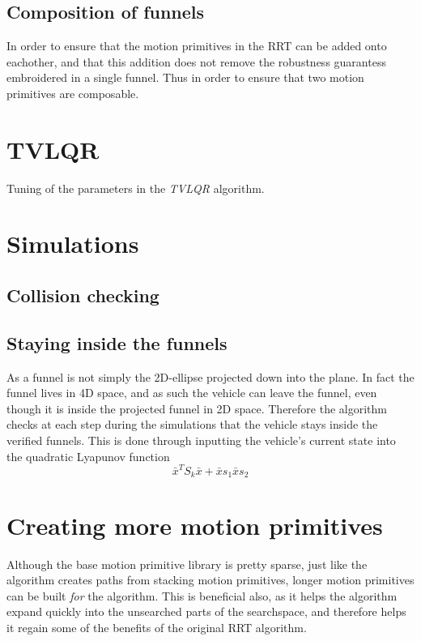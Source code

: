 \subsection{Composition of funnels}

In order to ensure that the motion primitives in the \ac{RRT} can be added onto
eachother, and that this addition does not remove the robustness guarantess
embroidered in a single funnel. Thus in order to ensure that two motion
primitives are composable.

\section{TVLQR}

Tuning of the parameters in the \textit{TVLQR} algorithm.

\section{Simulations}

\subsection{Collision checking}

\subsection{Staying inside the funnels}

As a funnel is not simply the 2D-ellipse projected down into the plane. In fact
the funnel lives in 4D space, and as such the vehicle can leave the funnel, even
though it is inside the projected funnel in 2D space. Therefore the \rrtfunnel{}
algorithm checks at each step during the simulations that the vehicle stays
inside the verified funnels. This is done through inputting the vehicle's
current state into the quadratic Lyapunov function
\[
  {\bar{x}}^{T}S_{k}\bar{x} + \bar{x}s_{1} \bar{x} s_{2}
\]

\section{Creating more motion primitives}

Although the base motion primitive library is pretty sparse, just like the
\rrtfunnel{} algorithm creates paths from stacking motion primitives, longer
motion primitives can be built \textit{for} the \rrtfunnel{} algorithm. This is
beneficial also, as it helps the algorithm expand quickly into the unsearched
parts of the searchspace, and therefore helps it regain some of the benefits of
the original \ac{RRT} algorithm.

